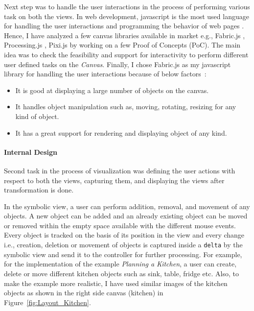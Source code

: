 Next step was to handle the user interactions in the process of performing various task on both the views. In web development, javascript is the most used language for handling the user interactions and programming the behavior of web pages \cite{javascript}. Hence, I have analyzed a few canvas libraries available in market e.g., Fabric.js \cite{fabricjs}, Processing.js \cite{processingjs}, Pixi.js \cite{pixijs}  by working on a few Proof of Concepts (PoC). The main idea was to check the feasibility and support for interactivity to perform different user defined tasks on the \textit{Canvas}. Finally, I chose Fabric.js as my javascript library for handling the user interactions because of below factors~\cite{fabricjs}:
\begin{itemize}
	\item {It is good at displaying a large number of objects on the canvas.}
	\item {It handles object manipulation such as, moving, rotating, resizing for any kind of object.}
	\item {It has a great support for rendering and displaying object of any kind.}
\end{itemize}

\paragraph{Internal Design}
Second task in the process of visualization was defining the user actions with respect to both the views, capturing them, and displaying the views after transformation is done.

In the symbolic view, a user can perform addition, removal, and movement of any objects. A new object can be added and an already existing object can be moved or removed within the empty space available with the different mouse events. Every object is tracked on the basis of its position in the view and every change i.e., creation, deletion or movement of objects is captured inside a \texttt{delta} by the symbolic view and send it to the controller for further processing. For example, for the implementation of the example \textit{Planning a Kitchen}, a user can create, delete or move different kitchen objects such as sink, table, fridge etc. Also, to make the example more realistic, I have used similar images of the kitchen objects as shown in the right side canvas (kitchen) in Figure~\ref{fig:Layout_Kitchen}. 

